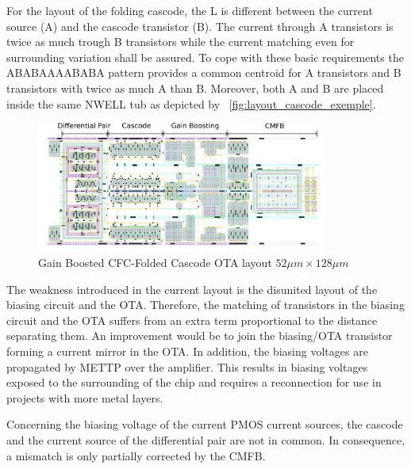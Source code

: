 For the layout of the folding cascode, the L is different between the current source (A) and the cascode transistor (B). The current through A transistors is twice as much trough B transistors while the current matching even for surrounding variation shall be assured. To cope with these basic requirements the ABABAAAABABA pattern provides a common centroid for A transistors and B transistors with twice as much A than B. Moreover, both A and B are placed inside the same NWELL tub as depicted by \figurename~\ref{fig:layout_cascode_exemple}.

\begin{figure}[htp]
    \centering
    \includegraphics[width=0.85\textwidth]{Chapter7/Figs/layout_ota_v2.png}
    \caption{Gain Boosted CFC-Folded Cascode OTA layout \(52 \mu m \times 128 \mu m\)}
    \label{fig:Gain-Boosted-CFC-Folded-Cascode-OTA-layout}
\end{figure}

The weakness introduced in the current layout is the disunited layout of the biasing circuit and the OTA\@. Therefore, the matching of transistors in the biasing circuit and the OTA suffers from an extra term proportional to the distance separating them. An improvement would be to join the biasing/OTA transistor forming a current mirror in the OTA\@. In addition, the biasing voltages are propagated by METTP over the amplifier. This results in biasing voltages exposed to the surrounding of the chip and requires a reconnection for use in projects with more metal layers.

Concerning the biasing voltage of the current PMOS current sources, the cascode and the current source of the differential pair are not in common. In consequence, a mismatch is only partially corrected by the CMFB\@.

